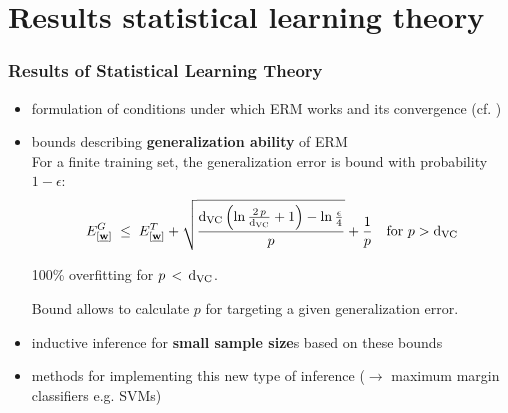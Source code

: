 \section{Results statistical learning theory}

\begin{frame}\frametitle{Results of Statistical Learning Theory}
		\begin{itemize}
			\item formulation of conditions under which ERM works and its convergence (cf. )
			\item bounds describing \textbf{generalization ability} of ERM \\
            
            For a finite training set, the generalization error is bound with probability $1-\epsilon$:
            \begin{equation}
				E^{G}_{[\underline{\mathbf{w}}]} \;\le\; E^{T}_{[\underline{\mathbf{w}}]} + \sqrt{\frac{\mathrm{d}_{\mathrm{VC}} \left(\ln \frac{2\,p}{\mathrm{d}_{\mathrm{VC}}} + 1\right)-\ln\frac{\epsilon}{4}}{p}} +\frac{1}{p} \quad \text{for } p > \mathrm{d}_{\mathrm{VC}}
				\label{eq:generalizationresults}
            \end{equation}
            
            
            
            100\% overfitting for $p\,<\,\mathrm{d}_{\mathrm{VC}}$.
            
            Bound allows to calculate $p$ for targeting a given generalization error.
            
			\item inductive inference for \textbf{small sample size}s 
				based on these bounds
			\item methods for implementing this new type 
				of inference ($\rightarrow$ maximum margin classifiers e.g. {SVMs})
		\end{itemize}
\end{frame}
